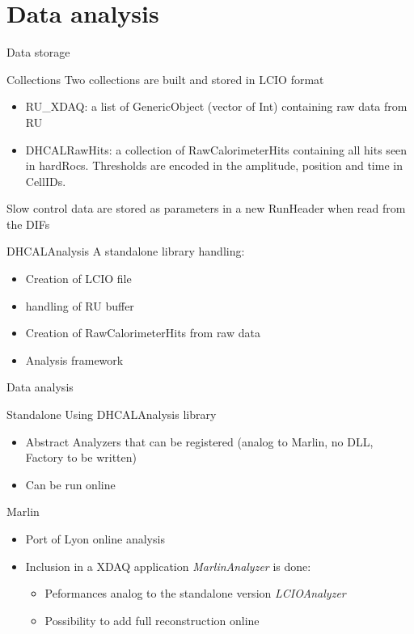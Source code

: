 \documentclass[10pt]{beamer}
\begin{document}
\section{Data analysis}
\begin{frame}[shrink=5]{Data storage}
\begin{block}{Collections}
Two collections are built and stored in LCIO format
\begin{itemize}
\item RU\_XDAQ: a list of  GenericObject (vector of Int) containing raw data from RU 
\item DHCALRawHits: a collection of RawCalorimeterHits containing all hits seen in hardRocs. Thresholds are encoded in the amplitude, position and time in CellIDs.
\end{itemize}
Slow control data are stored as parameters in a new RunHeader when read from the DIFs 
\end{block}
\pause 
\begin{block}{DHCALAnalysis}
A standalone library handling:
\begin{itemize}
  \item Creation of LCIO file
  \item handling of RU buffer
  \item Creation of RawCalorimeterHits from raw data
  \item Analysis framework
\end{itemize}

\end{block}
\end{frame}

\begin{frame}[shrink=5]{Data analysis}
  \begin{block}{Standalone}
    Using DHCALAnalysis library
    \begin{itemize}
      \item Abstract Analyzers that can be registered (analog to Marlin, no DLL, Factory to be written)
      \item Can be run online
    \end{itemize}
    
  \end{block}
  \pause 
  \begin{block}{Marlin}
    \begin{itemize}
    \item Port of Lyon online analysis
    \item Inclusion in a XDAQ application {\sl MarlinAnalyzer} is done:
      \begin{itemize}
        \item Peformances analog to the standalone version { \sl LCIOAnalyzer}
        \item Possibility to add full reconstruction online 
      \end{itemize}
  \end{itemize}
  \end{block}

\end{frame}
\end{document}
